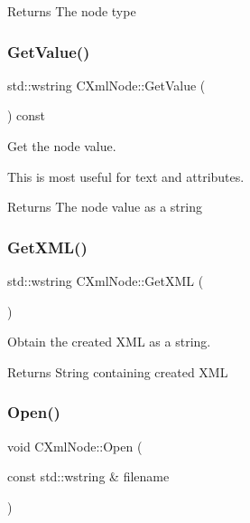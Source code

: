 \begin{DoxyReturn}{Returns}
The node type 
\end{DoxyReturn}
\mbox{\label{classxmlnode_1_1_c_xml_node_ac0593ce9fc62dd3e9777506c0c3a84bf}} 
\subsubsection{\texorpdfstring{GetValue()}{GetValue()}}
{\footnotesize\ttfamily std\+::wstring C\+Xml\+Node\+::\+Get\+Value (\begin{DoxyParamCaption}{ }\end{DoxyParamCaption}) const}



Get the node value. 

This is most useful for text and attributes. \begin{DoxyReturn}{Returns}
The node value as a string 
\end{DoxyReturn}
\mbox{\label{classxmlnode_1_1_c_xml_node_a700c3de386529eab05b185c38b17fd51}} 
\subsubsection{\texorpdfstring{GetXML()}{GetXML()}}
{\footnotesize\ttfamily std\+::wstring C\+Xml\+Node\+::\+Get\+X\+ML (\begin{DoxyParamCaption}{ }\end{DoxyParamCaption})}



Obtain the created X\+ML as a string. 

\begin{DoxyReturn}{Returns}
String containing created X\+ML 
\end{DoxyReturn}
\mbox{\label{classxmlnode_1_1_c_xml_node_abfd7b791490e58aac7091b78e36bd24b}} 
\subsubsection{\texorpdfstring{Open()}{Open()}}
{\footnotesize\ttfamily void C\+Xml\+Node\+::\+Open (\begin{DoxyParamCaption}\item[{const std\+::wstring \&}]{filename }\end{DoxyParamCaption})}



